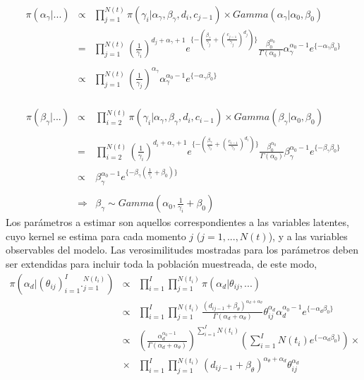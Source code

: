 \\
\begin{eqnarray*}
\pi(\alpha_\gamma|...)&\propto&\prod_{j=1}^{N(t)} \pi(\gamma_i|\alpha_\gamma,\beta_\gamma,d_i,c_{j-1})\times Gamma(\alpha_\gamma|\alpha_0,\beta_0)\\
&=&\prod_{j=1}^{N(t)}(\frac{1}{\gamma_i})^{d_j+\alpha_\gamma+1}e^{\{-(\frac{\beta_\gamma}{\gamma_j}+(\frac{c_{j-1}}{\gamma_j})^{d_j})\}}\frac{\beta_0^{\alpha_0}}{\Gamma(\alpha_0)} \alpha_\gamma^{\alpha_0-1}e^{\{-\alpha_\gamma\beta_0\}}\\
\\
&\propto&\prod_{j=1}^{N(t)} (\frac{1}{\gamma_j})^{\alpha_\gamma}\alpha_\gamma^{\alpha_0-1}e^{\{-\alpha_\gamma\beta_0\}}
\end{eqnarray*}
\\
\begin{eqnarray*}
\pi(\beta_\gamma|...)&\propto&\prod_{i=2}^{N(t)} \pi(\gamma_i|\alpha_\gamma,\beta_\gamma,d_i,c_{i-1})\times Gamma(\beta_\gamma|\alpha_0,\beta_0)\\
\\
&=&\prod_{i=2}^{N(t)}(\frac{1}{\gamma_i})^{d_i+\alpha_\gamma+1}e^{\{-(\frac{\beta_\gamma}{\gamma_i}+(\frac{c_{i-1}}{\gamma_i})^{d_i})\}}\frac{\beta_0^{\alpha_0}}{\Gamma(\alpha_0)} \beta_\gamma^{\alpha_0-1}e^{\{-\beta_\gamma\beta_0\}}\\
&\propto&\beta_\gamma^{\alpha_0-1}e^{\{-\beta_\gamma(\frac{1}{\gamma_i}+\beta_0)\}}\\
\\
&\Rightarrow& \beta_\gamma \sim Gamma(\alpha_0,\frac{1}{\gamma_i}+\beta_0)
\end{eqnarray*}
Los par\'ametros a estimar son aquellos correspondientes a las variables latentes, cuyo kernel se estima para cada momento $j$ ($j=1,...,N(t)$), y a las variables observables del modelo. Las verosimilitudes mostradas para los par\'ametros deben ser extendidas para incluir toda la poblaci\'on muestreada, de este modo,%
\begin{eqnarray*}
\pi(\alpha_d|(\theta_{ij})_{i=1}^I ._{j=1}^{N(t_i)})&\propto & \prod_{i=1}^I \prod_{j=1}^{N(t_i)} \pi(\alpha_d|\theta_{ij},...)\\
&\propto & \prod_{i=1}^I \prod_{j=1}^{N(t_i)} \frac{(d_{ij-1}+\beta_\theta)^{\alpha_d+\alpha_\theta}}{\Gamma(\alpha_d+\alpha_\theta)} \theta_{ij}^{\alpha_d}\alpha_d^{\alpha_0-1}e^{\{-\alpha_d\beta_0\}}\\
&\propto & (\frac{\alpha_d^{\alpha_0 -1}}{\Gamma(\alpha_d+\alpha_\theta)})^{\sum_{i=1}^I N(t_i)} (\sum_{i=1}^I N(t_i) e^{\{-\alpha_d\beta_0\}}) \times \\
&\times & \prod_{i=1}^I \prod_{j=1}^{N(t_i)} (d_{ij-1}+\beta_\theta)^{\alpha_\theta+\alpha_d} \theta_{ij}^{\alpha_d}
\end{eqnarray*}
